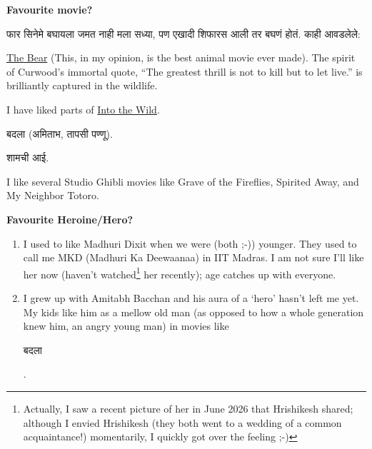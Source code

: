 \documentclass[17pt]{extarticle}  %
\begin{document}
\begin{enumerate}
\begin{english}
\item
\textbf{Favourite movie?}\\
\begin{marathi}
फार सिनेमे बघायला जमत नाही मला सध्या, पण एखादी शिफारस आली तर बघणं होतं. काही आवडलेले:
\end{marathi}
\begin{enumerate}
\item 
\begin{english}
\href{https://en.wikipedia.org/wiki/The_Bear_(1988_film)}{The Bear} (This, in my opinion, is the best animal movie ever made). The spirit of Curwood's immortal quote, \enquote{The greatest thrill is not to kill but to let live.} is brilliantly captured in the wildlife.
\item I have liked parts of \href{https://en.wikipedia.org/wiki/Into_the_Wild_(film)}{Into the Wild}.
\end{english}
\item \begin{marathi} बदला (अमिताभ, तापसी पण्णू).\end{marathi}
\item \begin{marathi} शामची आई.\end{marathi}

\item I like several Studio Ghibli movies like Grave of the Fireflies, Spirited Away, and My Neighbor Totoro.
\end{enumerate}

\item 
\textbf{Favourite Heroine/Hero?}\\
\begin{enumerate}
    \item I used to like Madhuri Dixit when we were (both ;-)) younger. They used to call me MKD (Madhuri Ka Deewaanaa) in IIT Madras. I am not sure I'll like her now (haven't watched\footnote{Actually, I saw a recent picture of her in June 2026 that Hrishikesh shared; although I envied Hrishikesh (they both went to a wedding of a common acquaintance!) momentarily, I quickly got over the feeling ;-)} her recently); age catches up with everyone.
\item I grew up with Amitabh Bacchan and his aura of a \enquote*{hero} hasn't left me yet. My kids like him as a mellow old man (as opposed to how a whole generation knew him, an angry young man) in movies like \begin{marathi}बदला\end{marathi}.
\end{enumerate}


\end{english}
\end{enumerate}
\end{document}

